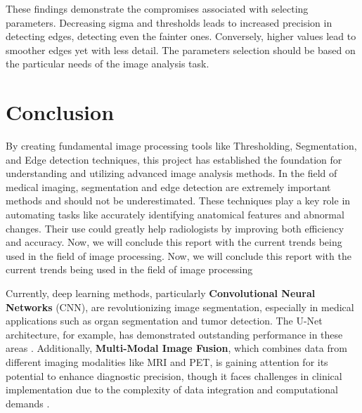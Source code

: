 \documentclass[%
	a4paper, %
	12pt, %
	english, %
	bibtotoc %
]{scrartcl}
\begin{document}
These findings demonstrate the compromises associated with selecting parameters. Decreasing sigma and thresholds leads to increased precision in detecting edges, detecting even the fainter ones. Conversely, higher values lead to smoother edges yet with less detail. The parameters selection should be based on the particular needs of the image analysis task.



\newpage
\section{Conclusion}

By creating fundamental image processing tools like Thresholding, Segmentation, and Edge detection techniques, this project has established the foundation for understanding and utilizing advanced image analysis methods. In the field of medical imaging, segmentation and edge detection are extremely important methods and should not be underestimated. These techniques play a key role in automating tasks like accurately identifying anatomical features and abnormal changes. Their use could greatly help radiologists by improving both efficiency and accuracy. Now, we will conclude this report with the current trends being used in the field of image processing. Now, we will conclude this report with the current trends being used in the field of image processing

Currently, deep learning methods, particularly \textbf{Convolutional Neural Networks} (CNN), are revolutionizing image segmentation, especially in medical applications such as organ segmentation and tumor detection. The U-Net architecture, for example, has demonstrated outstanding performance in these areas \cite{ronneberger_cnn}. Additionally, \textbf{Multi-Modal Image Fusion}, which combines data from different imaging modalities like MRI and PET, is gaining attention for its potential to enhance diagnostic precision, though it faces challenges in clinical implementation due to the complexity of data integration and computational demands \cite{james_medical_img_fusion}.
\end{document}
